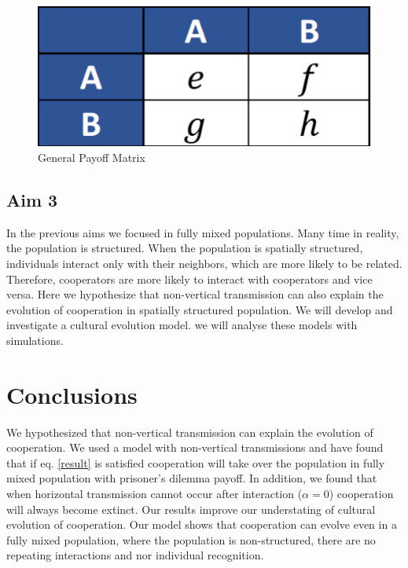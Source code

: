 \documentclass{article}
\begin{document}
\begin{figure}[h!]
  \centering
  \includegraphics[scale=0.4]{generalpayoff.pdf}
  \caption{General Payoff Matrix}
  \label{fig:generalPayoff}
\end{figure}

\subsection*{Aim 3}
In the previous aims we focused in fully mixed populations. Many time in reality, the population is structured. When the population is spatially structured, individuals interact only with their neighbors, which are more likely to be related. Therefore, cooperators are more likely to interact with cooperators and vice versa. Here we hypothesize that non-vertical transmission can also explain the evolution of cooperation in spatially structured population. We will develop and investigate a cultural evolution model. 
we will analyse these models with simulations. 

\newpage
\section*{Conclusions}
We hypothesized that non-vertical transmission can explain the evolution of cooperation. We used a model with non-vertical transmissions and have found that if eq. \eqref{result} is satisfied cooperation will take over the population in fully mixed population with prisoner's dilemma payoff. In addition, we found that when horizontal transmission cannot occur after interaction ($\alpha = 0$) cooperation will always become extinct. 
Our results improve our understating of cultural evolution of cooperation. Our model shows that cooperation can evolve even in a fully mixed population, where the population is non-structured, there are no repeating interactions and nor individual recognition.




\newpage
\end{document}
